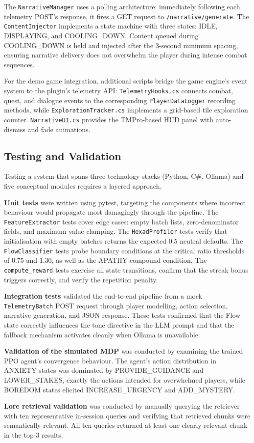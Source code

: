 The \texttt{NarrativeManager} uses a polling architecture: immediately following each telemetry POST's response, it fires a GET request to \texttt{/narrative/generate}. The \texttt{ContentInjector} implements a state machine with three states: IDLE, DISPLAYING, and COOLING\_DOWN. Content queued during COOLING\_DOWN is held and injected after the 3-second minimum spacing, ensuring narrative delivery does not overwhelm the player during intense combat sequences.

For the demo game integration, additional scripts bridge the game engine's event system to the plugin's telemetry API: \texttt{TelemetryHooks.cs} connects combat, quest, and dialogue events to the corresponding \texttt{PlayerDataLogger} recording methods, while \texttt{ExplorationTracker.cs} implements a grid-based tile exploration counter. \texttt{NarrativeUI.cs} provides the TMPro-based HUD panel with auto-dismiss and fade animations.

\subsection{Testing and Validation}

Testing a system that spans three technology stacks (Python, C\#, Ollama) and five conceptual modules requires a layered approach.

\textbf{Unit tests} were written using pytest, targeting the components where incorrect behaviour would propagate most damagingly through the pipeline. The \texttt{FeatureExtractor} tests cover edge cases: empty batch lists, zero-denominator fields, and maximum value clamping. The \texttt{HexadProfiler} tests verify that initialisation with empty batches returns the expected 0.5 neutral defaults. The \texttt{FlowClassifier} tests probe boundary conditions at the critical ratio thresholds of 0.75 and 1.30, as well as the APATHY compound condition. The \texttt{compute\_reward} tests exercise all state transitions, confirm that the streak bonus triggers correctly, and verify the repetition penalty.

\textbf{Integration tests} validated the end-to-end pipeline from a mock \texttt{TelemetryBatch} POST request through player modelling, action selection, narrative generation, and JSON response. These tests confirmed that the Flow state correctly influences the tone directive in the LLM prompt and that the fallback mechanism activates cleanly when Ollama is unavailable.

\textbf{Validation of the simulated MDP} was conducted by examining the trained PPO agent's convergence behaviour. The agent's action distribution in ANXIETY states was dominated by PROVIDE\_GUIDANCE and LOWER\_STAKES, exactly the actions intended for overwhelmed players, while BOREDOM states elicited INCREASE\_URGENCY and ADD\_MYSTERY.

\textbf{Lore retrieval validation} was conducted by manually querying the retriever with ten representative in-session queries and verifying that retrieved chunks were semantically relevant. All ten queries returned at least one clearly relevant chunk in the top-3 results.
